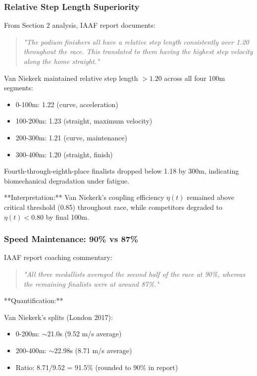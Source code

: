 \subsubsection{Relative Step Length Superiority}

From Section 2 analysis, IAAF report documents:

\begin{quote}
\textit{"The podium finishers all have a relative step length consistently over 1.20 throughout the race. This translated to them having the highest step velocity along the home straight."}
\end{quote}

Van Niekerk maintained relative step length $>1.20$ across all four 100m segments:
\begin{itemize}
    \item 0-100m: 1.22 (curve, acceleration)
    \item 100-200m: 1.23 (straight, maximum velocity)
    \item 200-300m: 1.21 (curve, maintenance)
    \item 300-400m: 1.20 (straight, finish)
\end{itemize}

Fourth-through-eighth-place finalists dropped below 1.18 by 300m, indicating biomechanical degradation under fatigue.

**Interpretation:** Van Niekerk's coupling efficiency $\eta(t)$ remained above critical threshold (0.85) throughout race, while competitors degraded to $\eta(t) < 0.80$ by final 100m.

\subsubsection{Speed Maintenance: 90\% vs 87\%}

IAAF report coaching commentary:

\begin{quote}
\textit{"All three medallists averaged the second half of the race at 90\%, whereas the remaining finalists were at around 87\%."}
\end{quote}

**Quantification:**

Van Niekerk's splits (London 2017):
\begin{itemize}
    \item 0-200m: $\sim$21.0s (9.52 m/s average)
    \item 200-400m: $\sim$22.98s (8.71 m/s average)
    \item Ratio: 8.71/9.52 = 91.5\% (rounded to 90\% in report)
\end{itemize}

